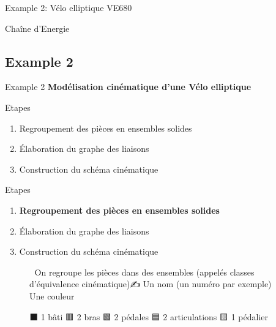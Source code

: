 \documentclass[
  ignorenonframetext,
  aspectratio=169,
  c]{beamer}
\providecommand{\tightlist}{%
  \setlength{\itemsep}{0pt}\setlength{\parskip}{0pt}}\usepackage{longtable,booktabs,array}
\begin{document}
\begin{frame}{Example 2: Vélo elliptique VE680}
\begin{block}{Chaîne d'Energie}
\begin{figure}
\end{figure}%
\end{block}
\end{frame}

\subsection{Example 2}\label{example-2}

\begin{frame}{Example 2}
\textbf{Modélisation cinématique d'une Vélo elliptique}
\end{frame}

\begin{frame}{Etapes}
\label{etapes-8}
\begin{enumerate}
\tightlist
\item
  Regroupement des pièces en ensembles solides
\item
  Élaboration du graphe des liaisons
\item
  Construction du schéma cinématique
\end{enumerate}
\end{frame}

\begin{frame}{Etapes}
\label{etapes-9}
\begin{enumerate}
\tightlist
\item
  \textbf{Regroupement des pièces en ensembles solides}
\item
  {Élaboration du graphe des liaisons}
\item
  {Construction du schéma cinématique}
\end{enumerate}

\begin{figure}

\begin{minipage}{0.70\linewidth}
🔎 On regroupe les pièces dans des ensembles (appelés classes
d'équivalence cinématique)✍️ Un nom (un numéro par exemple)🔵 Une
couleur\end{minipage}%
%
\begin{minipage}{0.30\linewidth}
⬛ 1 bâti 🟥 2 bras 🟩 2 pédales 🟦 2 articulations 🟨 1 pédalier
\end{minipage}%

\end{figure}%
\end{frame}
\end{document}
